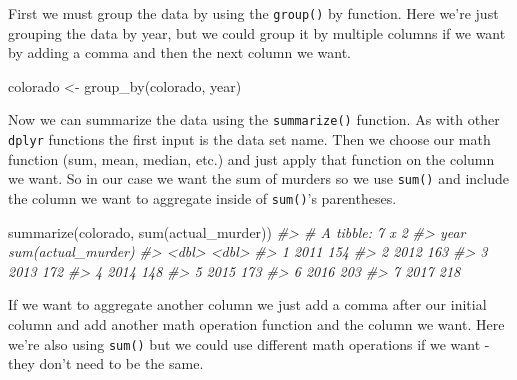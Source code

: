 \documentclass[
]{krantz}
\makeatletter
\newenvironment{Shaded}{\begin{snugshade}}{\end{snugshade}}
\newcommand{\CommentTok}[1]{\textcolor[rgb]{0.37,0.37,0.37}{\textit{#1}}}
\newcommand{\FunctionTok}[1]{\textcolor[rgb]{0,0,0}{#1}}
\newcommand{\NormalTok}[1]{#1}
\newcommand{\OtherTok}[1]{\textcolor[rgb]{0.37,0.37,0.37}{#1}}
\newenvironment{kframe}{%
\medskip{}
\setlength{\fboxsep}{.8em}
 \def\at@end@of@kframe{}%
 \ifinner\ifhmode%
  \def\at@end@of@kframe{\end{minipage}}%
  \begin{minipage}{\columnwidth}%
 \fi\fi%
 \def\FrameCommand##1{\hskip\@totalleftmargin \hskip-\fboxsep
 \colorbox{shadecolor}{##1}\hskip-\fboxsep
     \hskip-\linewidth \hskip-\@totalleftmargin \hskip\columnwidth}%
 \MakeFramed {\advance\hsize-\width
   \@totalleftmargin\z@ \linewidth\hsize
   \@setminipage}}%
 {\par\unskip\endMakeFramed%
 \at@end@of@kframe}
\renewenvironment{Shaded}{\begin{kframe}}{\end{kframe}}
\makeatother
\begin{document}
First we must group the data by using the \texttt{group()} by function. Here we're just grouping the data by year, but we could group it by multiple columns if we want by adding a comma and then the next column we want.

\begin{Shaded}
\begin{Highlighting}[]
\NormalTok{colorado }\OtherTok{\textless{}{-}} \FunctionTok{group\_by}\NormalTok{(colorado, year)}
\end{Highlighting}
\end{Shaded}

Now we can summarize the data using the \texttt{summarize()} function. As with other \texttt{dplyr} functions the first input is the data set name. Then we choose our math function (sum, mean, median, etc.) and just apply that function on the column we want. So in our case we want the sum of murders so we use \texttt{sum()} and include the column we want to aggregate inside of \texttt{sum()}'s parentheses.

\begin{Shaded}
\begin{Highlighting}[]
\FunctionTok{summarize}\NormalTok{(colorado, }\FunctionTok{sum}\NormalTok{(actual\_murder))}
\CommentTok{\#\textgreater{} \# A tibble: 7 x 2}
\CommentTok{\#\textgreater{}    year \textasciigrave{}sum(actual\_murder)\textasciigrave{}}
\CommentTok{\#\textgreater{}   \textless{}dbl\textgreater{}                \textless{}dbl\textgreater{}}
\CommentTok{\#\textgreater{} 1  2011                  154}
\CommentTok{\#\textgreater{} 2  2012                  163}
\CommentTok{\#\textgreater{} 3  2013                  172}
\CommentTok{\#\textgreater{} 4  2014                  148}
\CommentTok{\#\textgreater{} 5  2015                  173}
\CommentTok{\#\textgreater{} 6  2016                  203}
\CommentTok{\#\textgreater{} 7  2017                  218}
\end{Highlighting}
\end{Shaded}

If we want to aggregate another column we just add a comma after our initial column and add another math operation function and the column we want. Here we're also using \texttt{sum()} but we could use different math operations if we want - they don't need to be the same.
\end{document}
